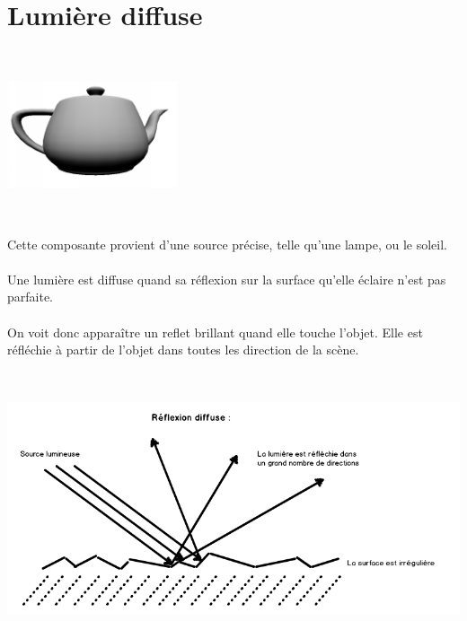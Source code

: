 \section{Lumière diffuse}
\begin{center}
\includegraphics[width=5cm,height=5cm]{pipeline/images/objet_diffuse.png}
\end{center}
Cette composante provient d'une source précise, telle qu'une lampe, ou le soleil.
\\\\
Une lumière est diffuse quand sa réflexion sur la surface qu'elle éclaire n'est pas parfaite.
\\\\
On voit donc apparaître un reflet brillant quand elle touche l'objet. Elle est réfléchie à partir de l'objet dans toutes les direction de la scène.
\\\\
\begin{center}
\includegraphics[width=17cm,height=7cm]{pipeline/images/reflexion_diffuse.png}
\end{center}

